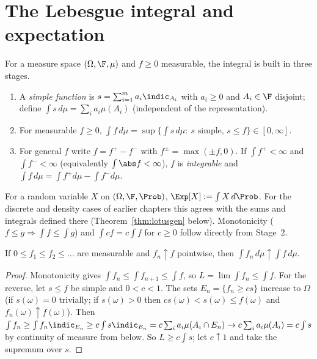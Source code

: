 \section{The Lebesgue integral and expectation}

For a measure space $(\Omega,\F,\mu)$ and $f\ge0$ measurable, the integral is built in three
stages.

\begin{enumerate}[label=\textbf{Stage \arabic*.}]
\item A \emph{simple function} is $s=\sum_{i=1}^ma_i\indic_{A_i}$ with $a_i\ge0$ and
$A_i\in\F$ disjoint; define $\int s\,d\mu=\sum_ia_i\mu(A_i)$ (independent of the
representation).
\item For measurable $f\ge0$, $\int f\,d\mu=\sup\bigl\{\int s\,d\mu:\ s\text{ simple},\,s\le f\bigr\}\in[0,\infty]$.
\item For general $f$ write $f=f^+-f^-$ with $f^\pm=\max(\pm f,0)$. If $\int f^+<\infty$ and
$\int f^-<\infty$ (equivalently $\int\abs f<\infty$), $f$ is \emph{integrable} and
$\int f\,d\mu=\int f^+d\mu-\int f^-d\mu$.
\end{enumerate}

For a random variable $X$ on $(\Omega,\F,\Prob)$, $\Exp[X]:=\int X\,d\Prob$. For the discrete and
density cases of earlier chapters this agrees with the sums and integrals defined there
(Theorem~\ref{thm:lotusgen} below). Monotonicity ($f\le g\Rightarrow\int f\le\int g$) and
$\int cf=c\int f$ for $c\ge0$ follow directly from Stage~2.

\begin{theorem}\label{thm:mct}
If $0\le f_1\le f_2\le\dots$ are measurable and $f_n\uparrow f$ pointwise, then
$\int f_n\,d\mu\uparrow\int f\,d\mu$.
\end{theorem}
\begin{proof}
Monotonicity gives $\int f_n\le\int f_{n+1}\le\int f$, so $L=\lim\int f_n\le\int f$. For the
reverse, let $s\le f$ be simple and $0<c<1$. The sets $E_n=\{f_n\ge cs\}$ increase to $\Omega$
(if $s(\omega)=0$ trivially; if $s(\omega)>0$ then $cs(\omega)<s(\omega)\le f(\omega)$ and
$f_n(\omega)\uparrow f(\omega)$). Then $\int f_n\ge\int f_n\indic_{E_n}\ge c\int s\indic_{E_n}
=c\sum_ia_i\mu(A_i\cap E_n)\to c\sum_ia_i\mu(A_i)=c\int s$ by continuity of measure from
below. So $L\ge c\int s$; let $c\uparrow1$ and take the supremum over $s$.
\end{proof}

